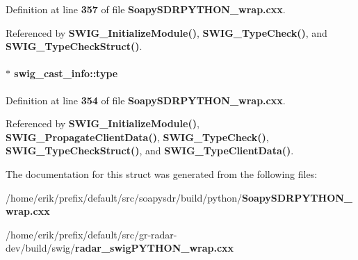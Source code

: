 Definition at line {\bf 357} of file {\bf Soapy\+S\+D\+R\+P\+Y\+T\+H\+O\+N\+\_\+wrap.\+cxx}.



Referenced by {\bf S\+W\+I\+G\+\_\+\+Initialize\+Module()}, {\bf S\+W\+I\+G\+\_\+\+Type\+Check()}, and {\bf S\+W\+I\+G\+\_\+\+Type\+Check\+Struct()}.

\paragraph[{type}]{ $\ast$ swig\+\_\+cast\+\_\+info\+::type}\label{structswig__cast__info_a06b74832d16cc0c4fd147e4c39095cd9}


Definition at line {\bf 354} of file {\bf Soapy\+S\+D\+R\+P\+Y\+T\+H\+O\+N\+\_\+wrap.\+cxx}.



Referenced by {\bf S\+W\+I\+G\+\_\+\+Initialize\+Module()}, {\bf S\+W\+I\+G\+\_\+\+Propagate\+Client\+Data()}, {\bf S\+W\+I\+G\+\_\+\+Type\+Check()}, {\bf S\+W\+I\+G\+\_\+\+Type\+Check\+Struct()}, and {\bf S\+W\+I\+G\+\_\+\+Type\+Client\+Data()}.



The documentation for this struct was generated from the following files\+:\begin{DoxyCompactItemize}
\item 
/home/erik/prefix/default/src/soapysdr/build/python/{\bf Soapy\+S\+D\+R\+P\+Y\+T\+H\+O\+N\+\_\+wrap.\+cxx}\item 
/home/erik/prefix/default/src/gr-\/radar-\/dev/build/swig/{\bf radar\+\_\+swig\+P\+Y\+T\+H\+O\+N\+\_\+wrap.\+cxx}\end{DoxyCompactItemize}
